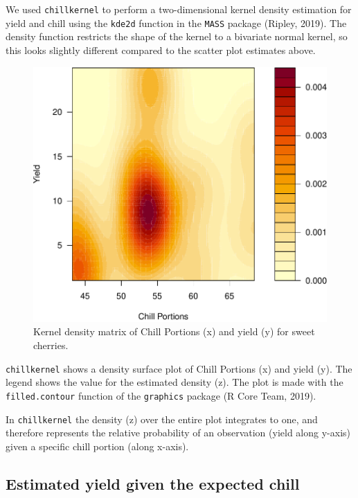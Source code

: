 \documentclass[]{article}
\begin{document}
We used \texttt{chillkernel} to perform a two-dimensional kernel density
estimation for yield and chill using the \texttt{kde2d} function in the
\texttt{MASS} package (Ripley, 2019). The density function restricts the
shape of the kernel to a bivariate normal kernel, so this looks slightly
different compared to the scatter plot estimates above.

\begin{figure}
\centering
\includegraphics{Chill_Yield_Qta_data_files/figure-latex/unnamed-chunk-3-1.pdf}
\caption{Kernel density matrix of Chill Portions (x) and yield (y) for
sweet cherries.}
\end{figure}

\texttt{chillkernel} shows a density surface plot of Chill Portions (x)
and yield (y). The legend shows the value for the estimated density (z).
The plot is made with the \texttt{filled.contour} function of the
\texttt{graphics} package (R Core Team, 2019).

In \texttt{chillkernel} the density (z) over the entire plot integrates
to one, and therefore represents the relative probability of an
observation (yield along y-axis) given a specific chill portion (along
x-axis).

\hypertarget{estimated-yield-given-the-expected-chill}{%
\subsection{Estimated yield given the expected
chill}\label{estimated-yield-given-the-expected-chill}}
\end{document}
